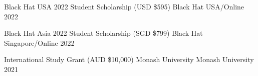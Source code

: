 


\begin{cvhonors}



    \cvhonor
    {Black Hat USA 2022 Student Scholarship (USD \$595)}
    {Black Hat}
    {USA/Online}
    {2022}


    
  \cvhonor
      {Black Hat Asia 2022 Student Scholarship (SGD \$799)}
      {Black Hat}
      {Singapore/Online}
      {2022}

  \cvhonor
    {International Study Grant (AUD \$10,000)} %
    {Monash University} %
    {Monash University} %
    {2021} %

\end{cvhonors}

\vspace{-3.0mm}